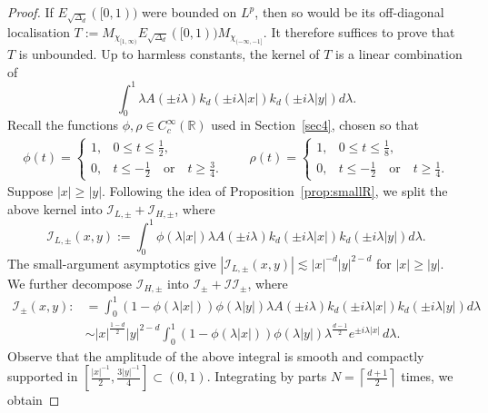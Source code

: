 \documentclass[12pt]{amsart}
\begin{document}
\begin{proof}
If \(E_{\sqrt{\Delta_d}}([0,1))\) were bounded on \(L^p\), then so would be
its off-diagonal localisation
$
T:=M_{\chi_{[1,\infty)}}E_{\sqrt{\Delta_d}}([0,1))
M_{\chi_{(-\infty,-1]}}.
$
It therefore suffices to prove that \(T\) is unbounded.
Up to harmless constants, the kernel of $T$ is a linear combination of 
\begin{equation*}
    \int_0^1 \lambda A(\pm i \lambda) k_d(\pm i \lambda |x|) k_d (\pm i \lambda |y|) d\lambda.
\end{equation*}
Recall the functions \(\phi,\rho\in C_c^\infty(\mathbb R)\) used in
Section~\ref{sec4}, chosen so that
\begin{align*}
    \phi(t) = \begin{cases}
        1, & 0\le t\le \frac{1}{2},\\
        0, & t\le -\frac{1}{2}\quad \textrm{or} \quad t\ge \frac{3}{4}.
    \end{cases} \qquad \rho(t) = \begin{cases}
        1, & 0\le t \le \frac{1}{8},\\
        0, & t\le -\frac{1}{2}\quad \textrm{or} \quad t\ge \frac{1}{4}.
    \end{cases}
\end{align*}
Suppose $|x|\ge |y|$. Following the idea of Proposition~\ref{prop:smallR}, we split the above kernel into $\mathcal{I}_{L,\pm}+\mathcal{I}_{H,\pm}$, where 
\begin{equation*}
\mathcal{I}_{L,\pm}(x,y) := \int_0^1 \phi(\lambda |x|) \lambda A(\pm i \lambda) k_d(\pm i \lambda |x|) k_d (\pm i \lambda |y|) d\lambda.
\end{equation*}
The small-argument asymptotics give
$|\mathcal{I}_{L,\pm}(x,y)|\lesssim |x|^{-d} |y|^{2-d}$ for $|x|\ge |y|$. We further decompose $\mathcal{I}_{H,\pm}$ into $\mathcal{I}_{\pm}+\mathcal{II}_{\pm}$, where
\begin{align*}
    \mathcal{I}_{\pm}(x,y):&= \int_0^1 \left(1-\phi(\lambda |x|) \right) \phi(\lambda |y|) \lambda A(\pm i \lambda) k_d(\pm i \lambda |x|) k_d (\pm i \lambda  |y|) d\lambda\\
    & \sim |x|^{\frac{1-d}{2}} |y|^{2-d} \int_0^1 \left(1-\phi(\lambda |x|) \right) \phi(\lambda |y|) \lambda^{\frac{d-1}{2}} e^{\pm i \lambda |x|}\, d\lambda. 
\end{align*}
Observe that the amplitude of the above integral is smooth and compactly supported in $[ \frac{|x|^{-1}}{2}, \frac{3|y|^{-1}}{4} ] \subset (0,1)$. Integrating by parts $N=\left\lceil \frac{d+1}{2} \right\rceil$ times, we obtain

\end{proof}
\end{document}

